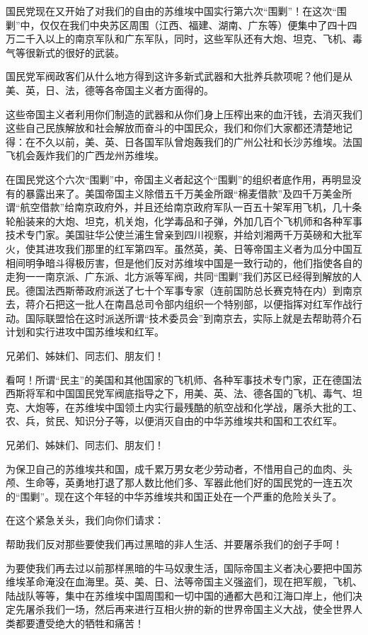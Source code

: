 国民党现在又开始了对我们的自由的苏维埃中国实行第六次“围剿”！在这次“围剿”中，仅仅在我们中央苏区周围（江西、福建、湖南、广东等）便集中了四十四万二千入以上的南京军队和广东军队，同时，这些军队还有大炮、坦克、飞机、毒气等很新式的很好的武装。

国民党军阀政客们从什么地方得到这许多新式武器和大批养兵款项呢？他们是从美、英，日、法，德等各帝国主义者方面得的。

这些帝国主义者利用你们制造的武器和从你们身上压榨出来的血汗钱，去消灭我们这些自己民族解放和社会解放而奋斗的中国民众，我们和你们大家都还清楚地记得：在不久以前，美、英、日各国军队曾炮轰我们的广州公社和长沙苏维埃。法国飞机会轰炸我们的广西龙州苏维埃。

在国民党这个六次“围剿”中，帝国主义者起这个“围剿”的组织者底作用，再明显没有的暴露出来了。美国帝国主义除借五千万美金所跟“棉麦借款”及四千万美金所谓“航空借款”给南京政府外，并且还给南京政府军队一百五十架军用飞机，几十条轮船装来的大炮、坦克，机关炮，化学毒品和子弹，外加几百个飞机师和各种军事技术专门家。美国驻华公使兰浦生曾亲到四川视察，并给刘湘两千万英磅和大批军火，使其进攻我们那里的红军第四军。虽然英，美、日等帝国主义者为瓜分中国互相间明争暗斗得极厉害，但是他们反对苏维埃中国是一致行动的，他们指使各自的走狗一一南京派、广东派、北方派等军阀，共同“围剿”我们苏区已经得到解放的人民。德国法西斯蒂政府派送了七十个军事专家（连前国防总长赛克特在内）到南京去，蒋介石把这一批人在南昌总司令部内组织一个特别部，以便指挥对红军作战行动。国际联盟恰在这时派送所谓“技术委员会”到南京去，实际上就是去帮助蒋介石计划和实行进攻中国苏维埃和红军。

兄弟们、姊妹们、同志们、朋友们！

看呵！所谓“民主”的美国和其他国家的飞机师、各种军事技术专门家，正在德国法西斯将军和中国国民党军阀底指导之下，用美、英、法、德各国的飞机、毒气、坦克、大炮等，在苏维埃中国领土内实行最残酷的航空战和化学战，屠杀大批的工、农、兵，贫民、知识分子等，以便消灭自由的中华苏维埃共和国和工农红军。

兄弟们、姊妹们、同志们、朋友们！

为保卫自己的苏维埃共和国，成千累万男女老少劳动者，不惜用自己的血肉、头颅、生命等，英勇地打退了那人数比他们多、军器此他们好的国民党的一连五次的“围剿”。现在这个年轻的中华苏维埃共和国正处在一个严重的危险关头了。

在这个紧急关头，我们向你们请求：

帮助我们反对那些要使我们再过黑暗的非人生活、并要屠杀我们的刽子手呵！

为要使我们再去过以前那样黑暗的牛马奴隶生活，国际帝国主义者决心要把中国苏维埃革命淹没在血海里。英、美、日、法等帝国主义强盗们，现在把军舰，飞机、陆战队等等，集中在苏维埃中国周围和一切中国的通都大邑和江海口岸上，他们决定先屠杀我们一场，然后再来进行互相火拚的新的世界帝国主义大战，使全世界人类都要遭受绝大的牺牲和痛苦！

